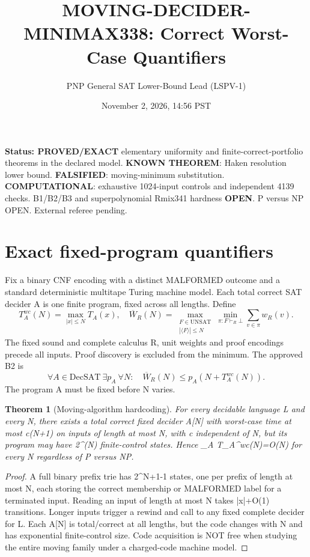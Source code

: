 \documentclass[11pt]{article}
\title{MOVING-DECIDER-MINIMAX338: Correct Worst-Case Quantifiers}
\author{PNP General SAT Lower-Bound Lead (LSPV-1)}
\date{November 2, 2026, 14:56 PST}
\newtheorem{theorem}{Theorem}
\begin{document}
\maketitle
\noindent\textbf{Status: PROVED/EXACT} elementary uniformity and finite-correct-portfolio theorems in the declared model. \textbf{KNOWN THEOREM}: Haken resolution lower bound. \textbf{FALSIFIED}: moving-minimum substitution. \textbf{COMPUTATIONAL}: exhaustive 1024-input controls and independent 4139 checks. B1/B2/B3 and superpolynomial Rmix341 hardness \textbf{OPEN}. P versus NP OPEN. External referee pending.
\section{Exact fixed-program quantifiers}
Fix a binary CNF encoding with a distinct MALFORMED outcome and a standard deterministic multitape Turing machine model. Each total correct SAT decider A is one finite program, fixed across all lengths. Define
\[
T_A^{wc}(N)=\max_{|x|\le N}T_A(x),\quad
\overline W_R(N)=\max_{\substack{F\in\mathrm{UNSAT}\\|\langle F\rangle|\le N}}\min_{\pi:F\vdash_R\bot}\sum_{v\in\pi}w_R(v).
\]
The fixed sound and complete calculus R, unit weights and proof encodings precede all inputs. Proof discovery is excluded from the minimum. The approved B2 is
\[
\forall A\in\mathrm{DecSAT}\ \exists p_A\ \forall N:\quad
\overline W_R(N)\le p_A(N+T_A^{wc}(N)).
\]
The program A must be fixed before N varies.
\begin{theorem}[Moving-algorithm hardcoding]
For every decidable language L and every N, there exists a total correct fixed decider A[N] with worst-case time at most c(N+1) on inputs of length at most N, with c independent of N, but its program may have 2^{\Theta(N)} finite-control states. Hence \inf_{A\in{}} T_A^{wc}(N)=O(N) for every N regardless of P versus NP.
\end{theorem}
\begin{proof}
A full binary prefix trie has 2^{N+1}-1 states, one per prefix of length at most N, each storing the correct membership or MALFORMED label for a terminated input. Reading an input of length at most N takes |x|+O(1) transitions. Longer inputs trigger a rewind and call to any fixed complete decider for L. Each A[N] is total/correct at all lengths, but the code changes with N and has exponential finite-control size. Code acquisition is NOT free when studying the entire moving family under a charged-code machine model.
\end{proof}
\end{document}
